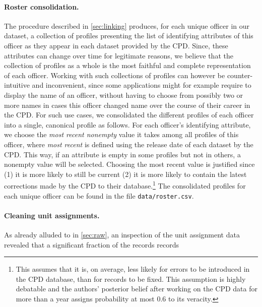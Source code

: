 \paragraph{Roster consolidation.}
The procedure described in \cref{sec:linking} produces, for each unique officer
in our dataset, a collection of profiles presenting the list of identifying
attributes of this officer as they appear in each dataset provided by the CPD.
Since, these attributes can change over time for legitimate reasons, we believe
that the collection of profiles as a whole is the most faithful and complete
representation of each officer. Working with such collections of profiles can
however be counter-intuitive and inconvenient, since some applications might
for example require to display the name of an officer, without having to choose
from possibly two or more names in cases this officer changed name over the
course of their career in the CPD. For such use cases, we consolidated the
different profiles of each officer into a single, canonical profile as follows.
For each officer's identifying attribute, we choose the \emph{most recent
nonempty} value it takes among all profiles of this officer, where \emph{most
recent} is defined using the release date of each dataset by the CPD. This way,
if an attribute is empty in some profiles but not in others, a nonempty value
will be selected. Choosing the most recent value is justified since (1) it is
more likely to still be current (2) it is more likely to contain the latest
corrections made by the CPD to their database.\footnote{This assumes that it
is, on average, less likely for errors to be introduced in the CPD database,
than for records to be fixed. This assumption is highly debatable and the
authors' posterior belief after working on the CPD data for more than a year
assigns probability at most $0.6$ to its veracity.} The consolidated profiles
for each unique officer can be found in the file \texttt{data/roster.csv}.

\paragraph{Cleaning unit assignments.} As already alluded to in \cref{sec:raw},
an inspection of the unit assignment data revealed that a significant fraction
of the records records 
